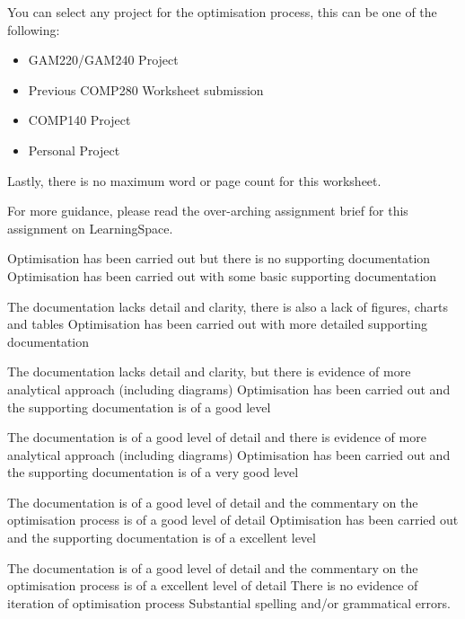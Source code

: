 \documentclass{../../../fal_assignment}
\begin{document}
You can select any project for the optimisation process, this can be one of the following:

\begin{itemize}
	\item GAM220/GAM240 Project
	\item Previous COMP280 Worksheet submission
	\item COMP140 Project
	\item Personal Project
\end{itemize}

Lastly, there is no maximum word or page count for this worksheet. 

For more guidance, please read the over-arching assignment brief for this assignment on LearningSpace.

\begin{markingrubric}
	\grade\fail Optimisation has been carried out but there is no supporting documentation
	\grade Optimisation has been carried out with some basic supporting documentation
	\par The documentation lacks detail and clarity, there is also a lack of figures, charts and tables
	\grade Optimisation has been carried out with more detailed supporting documentation
	\par The documentation lacks detail and clarity, but there is evidence of more analytical approach (including diagrams)
	\grade Optimisation has been carried out and the supporting documentation is of a good level
	\par The documentation is of a good level of detail and there is evidence of more analytical approach (including diagrams)
	\grade Optimisation has been carried out and the supporting documentation is of a very good level
	\par The documentation is of a good level of detail and the commentary on the optimisation process is of a good level of detail
	\grade Optimisation has been carried out and the supporting documentation is of a excellent level
	\par The documentation is of a good level of detail and the commentary on the optimisation process is of a excellent level of detail
	\grade\fail There is no evidence of iteration of optimisation process
	\grade\fail 	Substantial spelling and/or grammatical errors.

\end{markingrubric}
\end{document}
